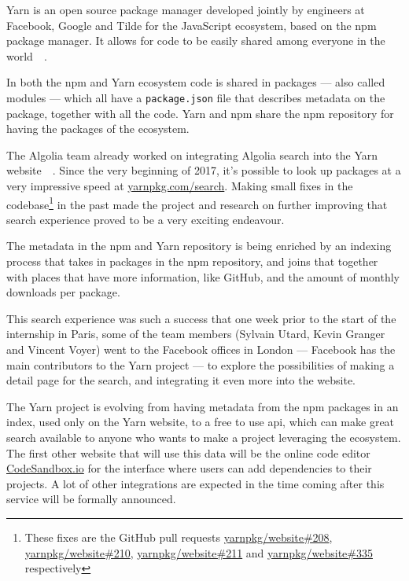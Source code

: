 Yarn is an open source package manager developed jointly by engineers at Facebook, Google and Tilde for the JavaScript ecosystem, based on the npm package manager. It allows for code to be easily shared among everyone in the world~\cite{yarn-site}~.

In both the npm and Yarn ecosystem code is shared in packages --- also called modules --- which all have a {\tt package.json} file that describes metadata on the package, together with all the code. Yarn and npm share the npm repository for having the packages of the ecosystem.

The Algolia team already worked on integrating Algolia search into the Yarn website~\cite{yarn-pr-add-algolia}~. Since the very beginning of 2017, it’s possible to look up packages at a very impressive speed at \href{https://yarnpkg.com/search}{yarnpkg.com/search}. Making small fixes in the codebase\footnote{These fixes are the GitHub pull requests \href{https://github.com/yarnpkg/website/pulls/208}{yarnpkg/website\#208}, \href{https://github.com/yarnpkg/website/pulls/210}{yarnpkg/website\#210}, \href{https://github.com/yarnpkg/website/pulls211}{yarnpkg/website\#211} and \href{https://github.com/yarnpkg/website/pulls/335}{yarnpkg/website\#335} respectively} in the past made the project and research on further improving that search experience proved to be a very exciting endeavour.

The metadata in the npm and Yarn repository is being enriched by an indexing process\cite{npm-search} that takes in packages in the npm repository, and joins that together with places that have more information, like GitHub, and the amount of monthly downloads per package.

This search experience was such a success that one week prior to the start of the internship in Paris, some of the team members (Sylvain Utard, Kevin Granger and Vincent Voyer) went to the Facebook offices in London --- Facebook has the main contributors to the Yarn project --- to explore the possibilities of making a detail page for the search, and integrating it even more into the website.

The Yarn project is evolving from having metadata from the npm packages in an index, used only on the Yarn website, to a free to use \acrshort{api}, which can make great search available to anyone who wants to make a project leveraging the ecosystem. The first other website that will use this data will be the online code editor \href{https://codesandbox.io}{CodeSandbox.io} for the interface where users can add dependencies to their projects. A lot of other integrations are expected in the time coming after this service will be formally announced.

